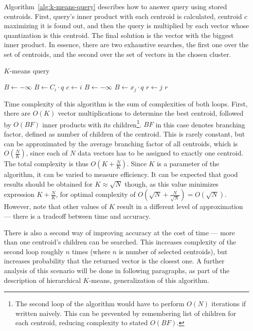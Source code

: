 Algorithm~\ref{alg:k-means-query} describes how to answer query using stored centroids.
First, query's inner product with each centroid is calculated, centroid $c$ maximizing it is
found out, and then the query is multiplied by each vector whose quantization is this centroid.
The final solution is the vector 
with the biggest inner product. In essence, there are two exhaustive searches,
the first one over the set of centroids, and the second over the set of vectors in the chosen cluster.

\begin{algorithm}
	\caption{$K$-means query}
	\begin{algorithmic}
		\State $B \gets -\infty$
				\State $B \gets C_i \cdot q$
				\State $c \gets i$
			\EndIf
		\EndFor
		\State $B \gets -\infty$
				\State $B \gets x_j \cdot q$
				\State $r \gets j$
			\EndIf
		\EndFor
		\State \Return $r$
	\end{algorithmic}
\label{alg:k-means-query}
\end{algorithm}

Time complexity of this algorithm is the sum of complexities of both loops.
First, there are $O(K)$ vector multiplications to determine the best centroid,
followed by $O(BF)$ inner products with its children\footnote{The second loop
of the algorithm would have to perform $O(N)$ iterations if written naively.
This can be prevented by remembering list of children for each centroid,
reducing complexity to stated $O(BF)$.}.
$BF$ in this case denotes
branching factor, defined as number of children of the centroid. This is rarely
constant, but can be approximated by the average branching factor of all centroids,
which is $O(\frac{N}{K})$, since each of $N$ data vectors has to be assigned
to exactly one centroid. The total complexity is thus $O(K + \frac{N}{K})$. Since
$K$ is a parameter of the algorithm, it can be varied to measure efficiency. It
can be expected that good results should be obtained for $K \approx \sqrt{N}$ 
though, as this value minimizes expression $K + \frac{N}{K}$, for optimal
complexity of $O(\sqrt{N} + \frac{N}{\sqrt{N}}) = O(\sqrt{N})$. However, note that other
values of $K$ result in a different level of approximation --- there is
a tradeoff between time and accuracy. 

There is also a second way of improving accuracy at the cost of time --- more
than one centroid's children can be searched. This increases complexity of the
second loop roughly $n$ times (where $n$ is number of selected centroids),
but increases probability that the returned vector is the closest one. A further
analysis of this scenario will be done in following paragraphs, as part
of the description of hierarchical $K$-means, generalization of this algorithm.


